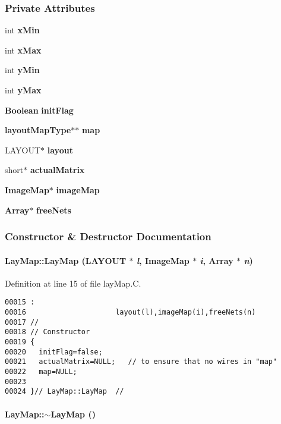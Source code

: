 \subsubsection*{Private Attributes}
\begin{CompactItemize}
\item 
int {\bf x\-Min}
\item 
int {\bf x\-Max}
\item 
int {\bf y\-Min}
\item 
int {\bf y\-Max}
\item 
{\bf Boolean} {\bf init\-Flag}
\item 
{\bf layout\-Map\-Type}$\ast$$\ast$ {\bf map}
\item 
LAYOUT$\ast$ {\bf layout}
\item 
short$\ast$ {\bf actual\-Matrix}
\item 
{\bf Image\-Map}$\ast$ {\bf image\-Map}
\item 
{\bf Array}$\ast$ {\bf free\-Nets}
\end{CompactItemize}


\subsubsection{Constructor \& Destructor Documentation}
\label{LayMap_a0}
\paragraph{\setlength{\rightskip}{0pt plus 5cm}Lay\-Map::Lay\-Map (LAYOUT $\ast$ {\em l}, {\bf Image\-Map} $\ast$ {\em i}, {\bf Array} $\ast$ {\em n})}\hfill



Definition at line 15 of file lay\-Map.C.\small\begin{verbatim}00015 :
00016                     layout(l),imageMap(i),freeNets(n)
00017 //
00018 // Constructor
00019 {
00020   initFlag=false;
00021   actualMatrix=NULL;   // to ensure that no wires in "map"
00022   map=NULL;
00023 
00024 }// LayMap::LayMap  //

\end{verbatim}\normalsize 
\label{LayMap_a1}
\paragraph{\setlength{\rightskip}{0pt plus 5cm}Lay\-Map::$\sim$Lay\-Map ()}\hfill



